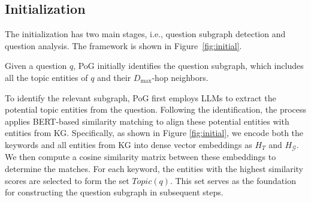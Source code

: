 \subsection{Initialization}
\label{method:initialization}

The initialization has two main stages, i.e., question subgraph detection and question analysis. The framework is shown in Figure~\ref{fig:initial}.











Given a question $q$, PoG initially identifies the question subgraph, which includes all the topic entities of $q$ and their $D_{\max}$-hop neighbors. 

To identify the relevant subgraph, PoG first employs LLMs to extract the potential topic entities from the question. Following the identification, the process applies BERT-based similarity matching to align these potential entities with entities from KG. Specifically, as shown in Figure \ref{fig:initial},
we encode both the keywords and all entities from KG
into dense vector embeddings as $H_T$ and $H_{\mathcal{G}}$. We then compute a cosine similarity matrix between these embeddings to determine the matches. For each keyword, the entities with the highest similarity scores are selected to form the set $Topic(q)$. This set serves as the foundation for constructing the question subgraph in subsequent steps. 



